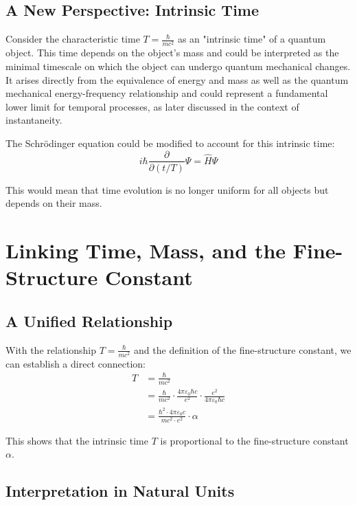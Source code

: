 \documentclass{article}
\begin{document}
	\subsection{A New Perspective: Intrinsic Time}
	
	Consider the characteristic time $T = \frac{\hbar}{mc^2}$ as an "intrinsic time" of a quantum object. This time depends on the object's mass and could be interpreted as the minimal timescale on which the object can undergo quantum mechanical changes. It arises directly from the equivalence of energy and mass as well as the quantum mechanical energy-frequency relationship and could represent a fundamental lower limit for temporal processes, as later discussed in the context of instantaneity.
	
	The Schrödinger equation could be modified to account for this intrinsic time:
	\begin{equation}
		i\hbar \frac{\partial}{\partial (t/T)}\Psi = \hat{H}\Psi
	\end{equation}
	
	This would mean that time evolution is no longer uniform for all objects but depends on their mass.
	
	\section{Linking Time, Mass, and the Fine-Structure Constant}
	
	\subsection{A Unified Relationship}
	
	With the relationship $T = \frac{\hbar}{mc^2}$ and the definition of the fine-structure constant, we can establish a direct connection:
	\begin{align}
		T &= \frac{\hbar}{mc^2} \\
		&= \frac{\hbar}{mc^2} \cdot \frac{4\pi\varepsilon_0\hbar c}{e^2} \cdot \frac{e^2}{4\pi\varepsilon_0\hbar c} \\
		&= \frac{\hbar^2 \cdot 4\pi\varepsilon_0 c}{mc^2 \cdot e^2} \cdot \alpha
	\end{align}
	
	This shows that the intrinsic time $T$ is proportional to the fine-structure constant $\alpha$.
	
	\subsection{Interpretation in Natural Units}
	
\end{document}
